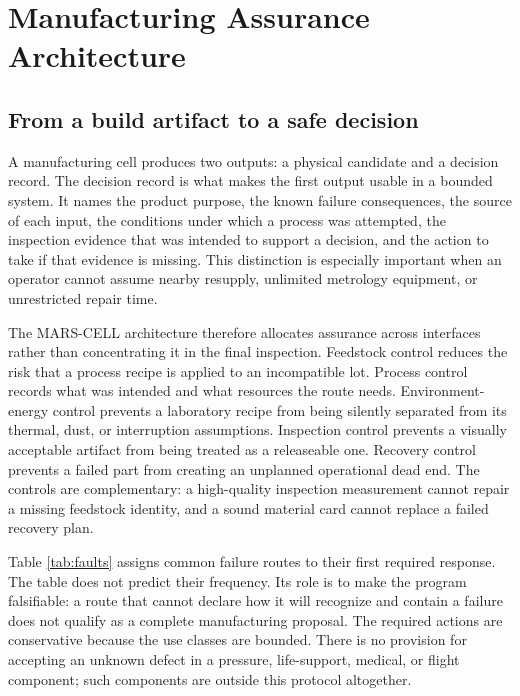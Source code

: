 \documentclass[conference]{../../../../Conference-LaTeX-template_10-17-19/IEEEtran}
\begin{document}
\section{Manufacturing Assurance Architecture}
\subsection{From a build artifact to a safe decision}
A manufacturing cell produces two outputs: a physical candidate and a decision record. The decision record is what makes the first output usable in a bounded system. It names the product purpose, the known failure consequences, the source of each input, the conditions under which a process was attempted, the inspection evidence that was intended to support a decision, and the action to take if that evidence is missing. This distinction is especially important when an operator cannot assume nearby resupply, unlimited metrology equipment, or unrestricted repair time.

The MARS-CELL architecture therefore allocates assurance across interfaces rather than concentrating it in the final inspection. Feedstock control reduces the risk that a process recipe is applied to an incompatible lot. Process control records what was intended and what resources the route needs. Environment-energy control prevents a laboratory recipe from being silently separated from its thermal, dust, or interruption assumptions. Inspection control prevents a visually acceptable artifact from being treated as a releaseable one. Recovery control prevents a failed part from creating an unplanned operational dead end. The controls are complementary: a high-quality inspection measurement cannot repair a missing feedstock identity, and a sound material card cannot replace a failed recovery plan.

Table \ref{tab:faults} assigns common failure routes to their first required response. The table does not predict their frequency. Its role is to make the program falsifiable: a route that cannot declare how it will recognize and contain a failure does not qualify as a complete manufacturing proposal. The required actions are conservative because the use classes are bounded. There is no provision for accepting an unknown defect in a pressure, life-support, medical, or flight component; such components are outside this protocol altogether.
\end{document}
